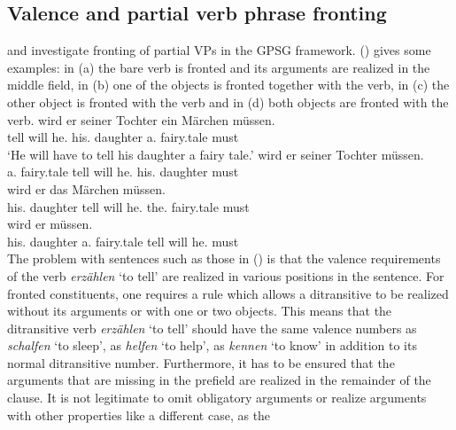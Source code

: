 \subsection{Valence and partial verb phrase fronting}

\citet{Nerbonne86a} and \citet{Johnson86a} investigate fronting of partial VPs in the GPSG
framework.
() gives some examples: in (a) the bare verb is fronted and its arguments are realized
in the middle field, in (b) one of the objects is fronted together with the verb, in
(c) the other object is fronted with the verb and in
(d) both objects are fronted with the verb.
\eal
\ex 
\gll [Erzählen] wird er        seiner     Tochter  ein      Märchen müssen.\\
     \spacebr{}tell     will he.\NOM{} his.\DAT{} daughter a.\ACC{} fairy.tale must\\
\glt `He will have to tell his daughter a fairy tale.'
\ex 
\label{ex-Ein-Märchen-erzählen-wird-er-seiner-Tochter-müssen}
 wird er        seiner     Tochter  müssen.\\
     \spacebr{}a.\ACC{} fairy.tale tell      will he.\NOM{} his.\DAT{} daughter must\\
\ex 
{} wird er das Märchen müssen.\\
     \spacebr{}his.\DAT{} daughter tell will he.\NOM{} the.\ACC{} fairy.tale  must\\
\ex 
{} wird er müssen.\\
     \spacebr{}his.\DAT{} daughter a.\ACC{} fairy.tale tell will he.\NOM{} must\\
\zl
\addlines[-2]
The problem with sentences such as those in () is that the valence requirements of the verb
\emph{erzählen} `to tell' are realized in various positions in the sentence. For fronted
constituents, one requires a rule which allows a ditransitive to be realized without its arguments
or with one or two objects. This means that the ditransitive verb \emph{erzählen} `to tell' should
have the same valence numbers as \emph{schalfen} `to sleep', as \emph{helfen} `to help', as
\emph{kennen} `to know' in addition to its normal ditransitive number. Furthermore, it has to be ensured that the arguments that are
missing in the prefield are realized in the remainder of the clause. It is not legitimate to omit
obligatory arguments or realize arguments with other properties like a different case, as the
